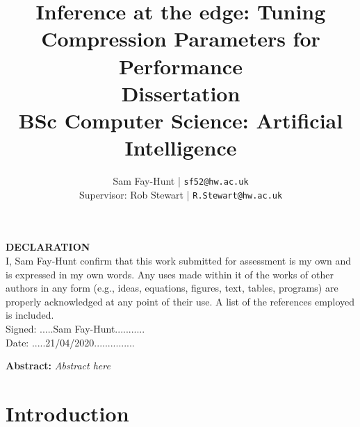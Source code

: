 \documentclass[11pt]{report}
\begin{document}
\title{%
	\bf Inference at the edge: Tuning Compression Parameters for Performance\\ 
	\large Dissertation \\
	BSc Computer Science: Artificial Intelligence}

\author{
	Sam Fay-Hunt | \texttt{sf52@hw.ac.uk}\\
	Supervisor: Rob Stewart | \texttt{R.Stewart@hw.ac.uk}
}

\maketitle
\thispagestyle{empty}
\pagebreak

\textbf{DECLARATION}\\
I, Sam Fay-Hunt confirm that this work submitted for assessment is my own and is expressed in
my own words. Any uses made within it of the works of other authors in any form (e.g., ideas,
equations, figures, text, tables, programs) are properly acknowledged at any point of their
use. A list of the references employed is included.\\
Signed: .....Sam Fay-Hunt...........\\
Date: .....21/04/2020...............
\thispagestyle{empty}
\pagebreak

\textbf{Abstract:} 
\emph{Abstract here}



\thispagestyle{empty}
\pagebreak

\tableofcontents
\thispagestyle{empty}
\pagebreak

\printnoidxglossary[type=acronym, nonumberlist]
\thispagestyle{empty}

\newpage
\setcounter{page}{1}

\chapter{Introduction}




\pagebreak
\end{document}
